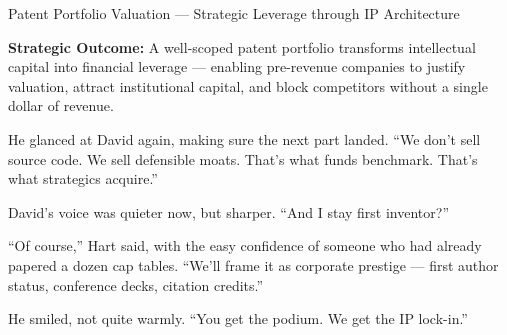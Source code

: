 \begin{TechnicalSidebar}{Patent Portfolio Valuation --- Strategic Leverage through IP Architecture}
    \medskip
    
    
    \textbf{Strategic Outcome:}  
    A well-scoped patent portfolio transforms intellectual capital into financial leverage — enabling 
    pre-revenue companies to justify valuation, attract institutional capital, and block competitors 
    without a single dollar of revenue.
    
\end{TechnicalSidebar}

\medskip

He glanced at David again, making sure the next part landed. ``We don’t sell source code. We sell 
defensible moats. That’s what funds benchmark. That’s what strategics acquire.''

David’s voice was quieter now, but sharper. ``And I stay first inventor?''

``Of course,'' Hart said, with the easy confidence of someone who had already papered a dozen cap 
tables. ``We’ll frame it as corporate prestige — first author status, conference decks, citation 
credits.''

He smiled, not quite warmly. ``You get the podium. We get the IP lock-in.''

\medskip

